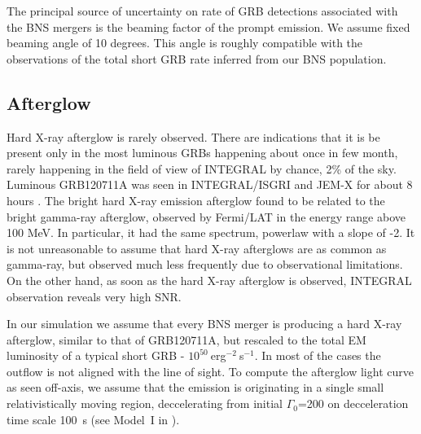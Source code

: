 \documentclass[a0,portrait]{a0poster}
\begin{document}
\begin{multicols}{2}
The principal source of uncertainty on rate of GRB detections
associated with the BNS mergers is the beaming factor of the prompt
emission. We assume fixed beaming angle of 10 degrees. This angle is
roughly compatible with the observations of the total short GRB rate
inferred from our BNS population.

\subsection*{Afterglow}

Hard X-ray afterglow is rarely observed. There are indications that it
is be present only in the most luminous GRBs happening about once in
few month, rarely happening in the field of view of INTEGRAL by
chance, 2\% of the sky. Luminous GRB120711A was seen in INTEGRAL/ISGRI
and JEM-X for about 8 hours \cite{martincarillo14}. The bright hard
X-ray emission afterglow found to be related to the bright gamma-ray
afterglow, observed by Fermi/LAT in the energy range above 100 MeV. In
particular, it had the same spectrum, powerlaw with a slope of -2. It
is not unreasonable to assume that hard X-ray afterglows are as common
as gamma-ray, but observed much less frequently due to observational
limitations. On the other hand, as soon as the hard X-ray afterglow is
observed, INTEGRAL observation reveals very high SNR.

In our simulation we assume that every BNS merger is producing a hard
X-ray afterglow, similar to that of GRB120711A, but rescaled to the
total EM luminosity of a typical short GRB -
$10^{50}~$erg$^{-2}~$s$^{-1}$. In most of the cases the outflow is not
aligned with the line of sight. To compute the afterglow light curve
as seen off-axis, we assume that the emission is originating in a
single small relativistically moving region, deccelerating from
initial $\Gamma_0$=200 on decceleration time scale 100~s (see Model~I
in \citep{xxx}).




\end{multicols}
\end{document}
